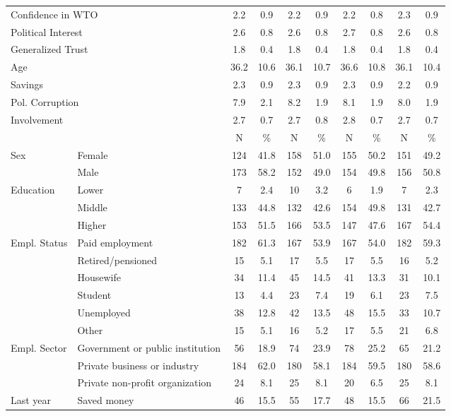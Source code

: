 \begin{table}
{\begin{tabular}[t]{llcccccccc}
\multicolumn{2}{l}{Confidence in WTO }  & 2.2 & 0.9 & 2.2 & 0.9 & 2.2 & 0.8 & 2.3 & 0.9\\
\multicolumn{2}{l}{Political Interest }  & 2.6 & 0.8 & 2.6 & 0.8 & 2.7 & 0.8 & 2.6 & 0.8\\
\multicolumn{2}{l}{Generalized Trust }  & 1.8 & 0.4 & 1.8 & 0.4 & 1.8 & 0.4 & 1.8 & 0.4\\
\multicolumn{2}{l}{Age }  & 36.2 & 10.6 & 36.1 & 10.7 & 36.6 & 10.8 & 36.1 & 10.4\\
\multicolumn{2}{l}{Savings }  & 2.3 & 0.9 & 2.3 & 0.9 & 2.3 & 0.9 & 2.2 & 0.9\\
\multicolumn{2}{l}{Pol. Corruption }  & 7.9 & 2.1 & 8.2 & 1.9 & 8.1 & 1.9 & 8.0 & 1.9\\
\multicolumn{2}{l}{Involvement }  & 2.7 & 0.7 & 2.7 & 0.8 & 2.8 & 0.7 & 2.7 & 0.7\\
\midrule
 &  & N & \% & N & \% & N & \% & N & \%\\
\midrule
Sex & Female & 124 & 41.8 & 158 & 51.0 & 155 & 50.2 & 151 & 49.2\\
 & Male & 173 & 58.2 & 152 & 49.0 & 154 & 49.8 & 156 & 50.8\\
Education & Lower & 7 & 2.4 & 10 & 3.2 & 6 & 1.9 & 7 & 2.3\\
 & Middle & 133 & 44.8 & 132 & 42.6 & 154 & 49.8 & 131 & 42.7\\
 & Higher & 153 & 51.5 & 166 & 53.5 & 147 & 47.6 & 167 & 54.4\\
Empl. Status & Paid employment & 182 & 61.3 & 167 & 53.9 & 167 & 54.0 & 182 & 59.3\\
 & Retired/pensioned & 15 & 5.1 & 17 & 5.5 & 17 & 5.5 & 16 & 5.2\\
 & Housewife & 34 & 11.4 & 45 & 14.5 & 41 & 13.3 & 31 & 10.1\\
 & Student & 13 & 4.4 & 23 & 7.4 & 19 & 6.1 & 23 & 7.5\\
 & Unemployed & 38 & 12.8 & 42 & 13.5 & 48 & 15.5 & 33 & 10.7\\
 & Other & 15 & 5.1 & 16 & 5.2 & 17 & 5.5 & 21 & 6.8\\
Empl. Sector & Government or public institution & 56 & 18.9 & 74 & 23.9 & 78 & 25.2 & 65 & 21.2\\
 & Private business or industry & 184 & 62.0 & 180 & 58.1 & 184 & 59.5 & 180 & 58.6\\
 & Private non-profit organization & 24 & 8.1 & 25 & 8.1 & 20 & 6.5 & 25 & 8.1\\
Last year & Saved money & 46 & 15.5 & 55 & 17.7 & 48 & 15.5 & 66 & 21.5\\

\end{tabular}}
\end{table}
